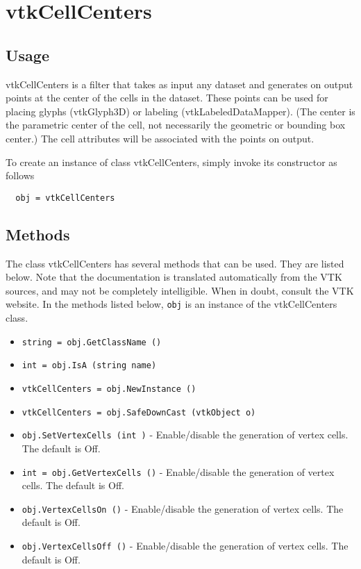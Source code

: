 \section{vtkCellCenters}

\subsection{Usage}

 vtkCellCenters is a filter that takes as input any dataset and 
 generates on output points at the center of the cells in the dataset.
 These points can be used for placing glyphs (vtkGlyph3D) or labeling 
 (vtkLabeledDataMapper). (The center is the parametric center of the
 cell, not necessarily the geometric or bounding box center.) The cell
 attributes will be associated with the points on output.
 

To create an instance of class vtkCellCenters, simply
invoke its constructor as follows
\begin{verbatim}
  obj = vtkCellCenters
\end{verbatim}
\subsection{Methods}

The class vtkCellCenters has several methods that can be used.
  They are listed below.
Note that the documentation is translated automatically from the VTK sources,
and may not be completely intelligible.  When in doubt, consult the VTK website.
In the methods listed below, \verb|obj| is an instance of the vtkCellCenters class.
\begin{itemize}
\item  \verb|string = obj.GetClassName ()|

\item  \verb|int = obj.IsA (string name)|

\item  \verb|vtkCellCenters = obj.NewInstance ()|

\item  \verb|vtkCellCenters = obj.SafeDownCast (vtkObject o)|

\item  \verb|obj.SetVertexCells (int )| -  Enable/disable the generation of vertex cells. The default
 is Off.

\item  \verb|int = obj.GetVertexCells ()| -  Enable/disable the generation of vertex cells. The default
 is Off.

\item  \verb|obj.VertexCellsOn ()| -  Enable/disable the generation of vertex cells. The default
 is Off.

\item  \verb|obj.VertexCellsOff ()| -  Enable/disable the generation of vertex cells. The default
 is Off.

\end{itemize}
